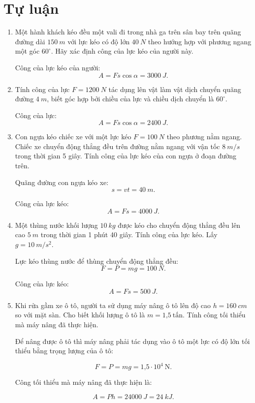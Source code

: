 \section{Tự luận}
\begin{enumerate}[label=\bfseries Câu \arabic*:]
		\item {}
	
	
	{
			Một hành khách kéo đều một vali đi trong nhà ga trên sân bay trên quãng đường dài $\SI{150}{m}$ với lực kéo có độ lớn $\SI{40}{N}$ theo hướng hợp với phương ngang một góc $60^\circ$. Hãy xác định công của lực kéo của người này.
	}
	
	\hideall
	{	
		Công của lực kéo của người: $$A=Fs\cos \alpha = \SI{3000}{J}.$$
	}
	
		\item {}
	
	
	{
		Tính công của lực $F=\SI{1200}{N}$ tác dụng lên vật làm vật dịch chuyển quãng đường $\SI{4}{m}$, biết góc hợp bởi chiều của lực và chiều dịch chuyển là $60^\circ$.
	}
	
	\hideall
	{	
		Công của lực: $$A=Fs\cos \alpha = \SI{2400}{J}.$$
	}

		\item {}
	
	
	{
		Con ngựa kéo chiếc xe với một lực kéo $F=\SI{100}{N}$ theo phương nằm ngang. Chiếc xe chuyển động thẳng đều trên đường nằm ngang với vận tốc $\SI{8}{m/s}$ trong thời gian 5 giây. Tính công của lực kéo của con ngựa ở đoạn đường trên. 
	}
	
	\hideall
	{	
		Quãng đường con ngựa kéo xe:
		$$s=vt=\SI{40}{m}.$$
		
		Công của lực kéo:
		$$A=Fs=\SI{4000}{J}.$$
	}
			\item {}
	
	
	{
		Một thùng nước khối lượng $\SI{10}{kg}$ được kéo cho chuyển động thẳng đều lên cao $\SI{5}{m}$ trong thời gian 1 phút 40 giây. Tính công của lực kéo. Lấy $g=\SI{10}{m/s^2}$.
	}
	
	\hideall
	{	
		Lực kéo thùng nước để thùng chuyển động thẳng đều:
		$$F=P=mg=\SI{100}{N}.$$
		
		Công của lực kéo:
		$$A=Fs=\SI{500}{J}.$$
	}
		\item {}
	
	
	{
		Khi rửa gầm xe ô tô, người ta sử dụng máy nâng ô tô lên độ cao $h = \SI{160}{cm}$ so với mặt sàn. Cho biết khối lượng ô tô là $m = \text{1,5}\ \text{tấn}$. Tính công tối thiểu mà máy nâng đã thực hiện.
	}
	
	\hideall
	{	
		Để nâng được ô tô thì máy nâng phải tác dụng vào ô tô một lực có độ lớn tối thiểu bằng trọng lượng của ô tô:
		
		$$F = P =mg = \text{1,5} \cdot 10^4\ \text{N}.$$
		
		Công tối thiểu mà máy nâng đã thực hiện là:
		
		$$A = Ph = \SI{24000}{J} = \SI{24}{kJ}.$$
		
	}
	
	
\end{enumerate}